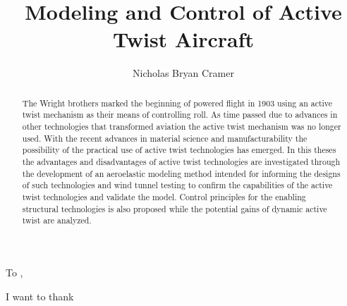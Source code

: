 \documentclass[11pt]{ucthesis}
\begin{document}

\title{Modeling and Control of Active Twist Aircraft}
\author{Nicholas Bryan Cramer}
\deanlinethree{}

\begin{frontmatter}

\maketitle
\copyrightpage

\tableofcontents
\listoffigures
\listoftables

\begin{abstract}
The Wright brothers marked the beginning of powered flight in 1903 using an active twist mechanism as their means of controlling roll. As time passed due to advances in other technologies that transformed aviation the active twist mechanism was no longer used. With the recent advances in material science and manufacturability the possibility of the practical use of active twist technologies has emerged. In this theses the advantages and disadvantages of active twist technologies are investigated through the development of an aeroelastic modeling method intended for informing the designs of such technologies and wind tunnel testing to confirm the capabilities of the active twist technologies and validate the model. Control principles for the enabling structural technologies is also proposed while the potential gains of dynamic active twist are analyzed.

\end{abstract}

\begin{dedication}
\null\vfil
{\large
\begin{center}
To ,\\\vspace{12pt}

\end{center}}
\vfil\null
\end{dedication}


\begin{acknowledgements}
I want to thank
\end{acknowledgements}

\end{frontmatter}
\end{document}
